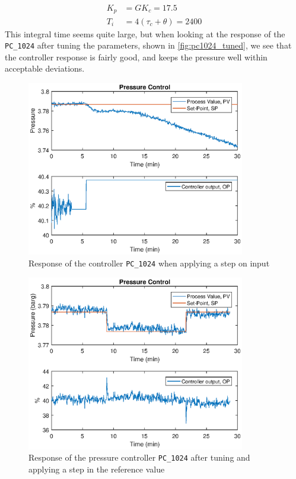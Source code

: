 \begin{equation}
	\begin{aligned}
		K_p &= GK_c = 17.5\\
		T_i &= 4(\tau_c + \theta) = 2400
	\end{aligned}
\end{equation}
This integral time seems quite large, but when looking at the response of the \texttt{PC\_1024} after tuning the parameters, shown in \autoref{fig:pc1024_tuned}, we see that the controller response is fairly good, and keeps the pressure well within acceptable deviations.

\begin{figure}[ht!]
	\centering
	\includegraphics[width=0.85\textwidth]{fig/tuning/PC1024_simc.eps}
	\caption{Response of the controller \texttt{PC\_1024} when applying a step on input}
	\label{fig:pc1024_simc}
\end{figure}
\begin{figure}[ht!]
	\centering
	\includegraphics[width=0.85\textwidth]{fig/tuning/PC1024_tuned.eps}
	\caption{Response of the pressure controller \texttt{PC\_1024} after tuning and applying a step in the reference value}
	\label{fig:pc1024_tuned}
\end{figure}

